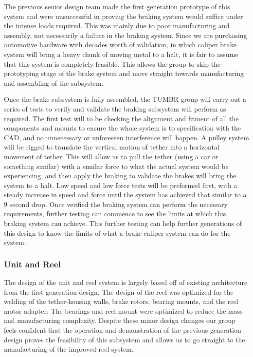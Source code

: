 \indent\indent The previous senior design team made the first generation prototype of this system and were unsuccessful in proving the braking system would suffice under the intense loads required. This was mainly due to poor manufacturing and assembly, not necessarily a failure in the braking system. Since we are purchasing automotive hardware with decades worth of validation, in which caliper brake system will bring a heavy chunk of moving metal to a halt, it is fair to assume that this system is completely feasible. This allows the group to skip the prototyping stage of the brake system and move straight towards manufacturing and assembling of the subsystem.

Once the brake subsystem is fully assembled, the TUMBR group will carry out a series of tests to verify and validate the braking subsystem will perform as required. The first test will to be checking the alignment and fitment of all the components and mounts to ensure the whole system is to specification with the CAD, and no unnecessary or unforeseen interference will happen. A pulley system will be rigged to translate the vertical motion of tether into a horizontal movement of tether. This will allow us to pull the tether (using a car or something similar) with a similar force to what the actual system would be experiencing, and then apply the braking to validate the brakes will bring the system to a halt. Low speed and low force tests will be preformed first, with a steady increase in speed and force until the system has achieved that similar to a 9 second drop. Once verified the braking system can perform the necessary requirements, further testing can commence to see the limits at which this braking system can achieve. This further testing can help further generations of this design to know the limits of what a brake caliper system can do for the system. 


\subsubsection{Unit and Reel}

\indent\indent The design of the unit and reel system is largely based off of existing architecture from the first generation design. The design of the reel was optimized for the welding of the tether-housing walls, brake rotors, bearing mounts, and the reel motor adapter. The bearings and reel mount were optimized to reduce the mass and manufacturing complexity.
Despite these minor design changes our group feels confident that the operation and demonstration of the previous generation design proves the feasibility of this subsystem and allows us to go straight to the manufacturing of the improved reel system. 

